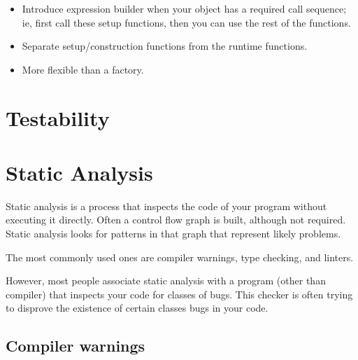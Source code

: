 \documentclass{article}
\begin{document}
\begin{center}
    \begin{itemize}
        \item Introduce expression builder when your object has a required call sequence; ie, first call these setup functions, then you can use the rest of the functions. 
        \item Separate setup/construction functions from the runtime functions. 
        \item More flexible than a factory.
    \end{itemize}
\end{center}


\pagebreak

\section{Testability}

\pagebreak

\section{Static Analysis}

Static analysis is a process that inspects the code of your program without executing it directly. Often a control flow graph is built, although not required. Static analysis looks for patterns in that graph that represent likely problems.

\vspace*{1em}

The most commonly used ones are compiler warnings, type checking, and linters.

However, most people associate static analysis with a program (other than compiler) that inspects your code for classes of bugs. This checker is often trying to disprove the existence of certain classes bugs in your code. 

\vspace*{1em}

\subsection{Compiler warnings}
\end{document}
